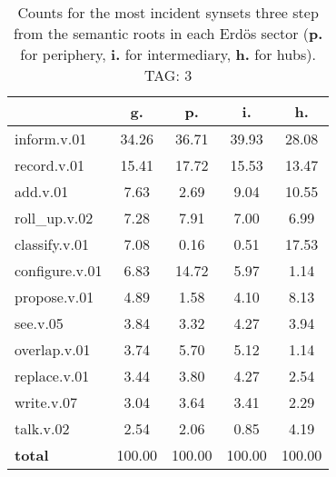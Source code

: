 \begin{table}[h!]
\begin{center}
\begin{tabular}{| l || c | c | c | c |}\hline
 & {\bf g.} & {\bf p.} & {\bf i.} & {\bf h.} \\\hline\hline
inform.v.01 & 34.26  & 36.71  & 39.93  & 28.08 \\\hline
record.v.01 & 15.41  & 17.72  & 15.53  & 13.47 \\\hline
add.v.01 & 7.63  & 2.69  & 9.04  & 10.55 \\\hline
roll\_up.v.02 & 7.28  & 7.91  & 7.00  & 6.99 \\\hline
classify.v.01 & 7.08  & 0.16  & 0.51  & 17.53 \\\hline
configure.v.01 & 6.83  & 14.72  & 5.97  & 1.14 \\\hline
propose.v.01 & 4.89  & 1.58  & 4.10  & 8.13 \\\hline
see.v.05 & 3.84  & 3.32  & 4.27  & 3.94 \\\hline
overlap.v.01 & 3.74  & 5.70  & 5.12  & 1.14 \\\hline
replace.v.01 & 3.44  & 3.80  & 4.27  & 2.54 \\\hline
write.v.07 & 3.04  & 3.64  & 3.41  & 2.29 \\\hline
talk.v.02 & 2.54  & 2.06  & 0.85  & 4.19 \\\hline\hline
{{\bf total}} & 100.00  & 100.00  & 100.00  & 100.00 \\\hline
\end{tabular}
\caption{Counts for the most incident synsets three step from the semantic roots in each Erd\"os sector ({\bf p.} for periphery, {\bf i.} for intermediary, {\bf h.} for hubs). TAG: 3}
\end{center}
\end{table}